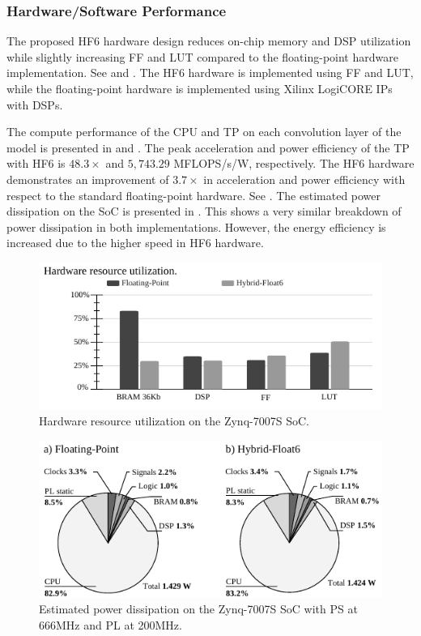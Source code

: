 \subsubsection{Hardware/Software Performance}
The proposed HF6 hardware design reduces on-chip memory and DSP utilization while slightly increasing FF and LUT compared to the floating-point hardware implementation. See  and . The HF6 hardware is implemented using FF and LUT, while the floating-point hardware is implemented using Xilinx LogiCORE IPs with DSPs.

The compute performance of the CPU and TP on each convolution layer of the model is presented in  and . The peak acceleration and power efficiency of the TP with HF6 is $48.3\times$ and $5,743.29$ MFLOPS/s/W, respectively. The HF6 hardware demonstrates an improvement of $3.7\times$ in acceleration and power efficiency with respect to the standard floating-point hardware. See . The estimated power dissipation on the SoC is presented in . This shows a very similar breakdown of power dissipation in both implementations. However, the energy efficiency is increased due to the higher speed in HF6 hardware.

\begin{figure}[h!]
	\centering
	\includegraphics[width=1\columnwidth]{../figures/power_breakdown/resource_utilization.pdf}
	\caption{Hardware resource utilization on the Zynq-7007S SoC.}
	\label{fig:resource_utilization}
\end{figure}

\begin{figure}[h!]
	\centering
	\includegraphics[width=1\columnwidth]{../figures/power_breakdown/power_breakdown.pdf}
	\caption{Estimated power dissipation on the Zynq-7007S SoC with PS at 666MHz and PL at 200MHz.}
	\label{fig:power}
\end{figure}

